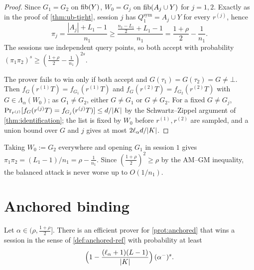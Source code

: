 \begin{proof}
Since $G_1=G_2$ on $\mathrm{fib}(Y)$, $W_0=G_j$ on $\mathrm{fib}(A_j\cup Y)$ for $j=1,2$. Exactly as in
the proof of \cref{thm:ub-tight}, session $j$ has
$Q_1^{\mathrm{sym}}=A_j\cup Y$ for every $r^{(j)}$, hence
\[
\pi_j=\frac{|A_j|+L_1-1}{n_1}\ge\frac{\frac{n_1-L_1}2+L_1-1}{n_1}=\frac{1+\rho}2-\frac1{n_1}.
\]
The sessions use independent query points, so both accept with probability
$(\pi_1\pi_2)^s\ge(\frac{1+\rho}2-\frac1{n_1})^{2s}$.

The prover fails to win only if both accept and $G(\tau_1)=G(\tau_2)=G\ne\bot$. Then
$f_G(r^{(1)}T)=f_{G_1}(r^{(1)}T)$ and $f_G(r^{(2)}T)=f_{G_2}(r^{(2)}T)$ with
$G\in\Lambda_\alpha(W_0)$; as $G_1\ne G_2$, either $G\ne G_1$ or $G\ne G_2$. For a fixed
$G\ne G_j$, $\Pr_{r^{(j)}}[f_G(r^{(j)}T)=f_{G_j}(r^{(j)}T)]\le d/|K|$ by the
Schwartz--Zippel argument of \cref{thm:identification}; the list is fixed by $W_0$ before
$r^{(1)},r^{(2)}$ are sampled, and a union bound over $G$ and $j$ gives at most
$2\ell_\alpha d/|K|$.
\end{proof}

\begin{remark}\label{rem:unbalanced}
Taking $W_0:=G_2$ everywhere and opening $G_1$ in session $1$ gives
$\pi_1\pi_2=(L_1-1)/n_1=\rho-\frac1{n_1}$. Since $(\frac{1+\rho}2)^2\ge\rho$ by the AM--GM
inequality, the balanced attack is never worse up to $O(1/n_1)$.
\end{remark}

\section{Anchored binding}

\begin{theorem}\label{thm:anchored-attack}
Let $\alpha\in(\rho,\frac{1+\rho}2]$. There is an efficient prover for \cref{prot:anchored}
that wins a session in the sense of \cref{def:anchored-ref} with probability at least
\[
\Bigl(1-\frac{(\ell_\alpha+1)(L-1)}{|K|}\Bigr)\,(\alpha^-)^{s}.
\]
\end{theorem}

